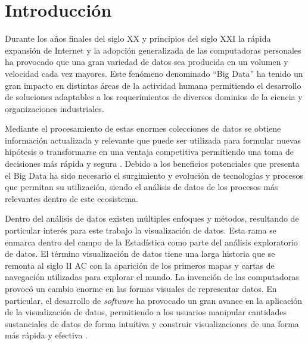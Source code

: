 \chapter*{Introducción}\label{chapter:introduction}

Durante los a\~nos finales del siglo XX y principios del siglo XXI la
r\'apida expansi\'on de Internet y la adopci\'on generalizada de las
computadoras personales ha provocado que una gran variedad de datos sea
producida en un volumen y velocidad cada vez mayores. Este fen\'omeno
denominado ``Big Data'' \cite{beyer2012importance} ha tenido un gran impacto en distintas \'areas de
la actividad humana permitiendo el desarrollo de soluciones adaptables a los
requerimientos de diversos dominios de la ciencia y organizaciones industriales.

Mediante el procesamiento de estas enormes colecciones de datos se
obtiene informaci\'on actualizada y relevante que puede ser utilizada para
formular nuevas hip\'otesis o transformarse en una ventaja competitiva permitiendo
una toma de decisiones m\'as r\'apida y segura \cite{de2016formal}. Debido a los beneficios potenciales
que presenta el Big Data ha sido necesario el surgimiento y evoluci\'on de
tecnolog\'ias y procesos que permitan su utilizaci\'on, siendo el an\'alisis
de datos de los procesos m\'as relevantes dentro de este ecosistema.

Dentro del an\'alisis de datos existen m\'ultiples enfoques y m\'etodos, resultando
de particular inter\'es para este trabajo la visualizaci\'on de datos. Esta rama se enmarca
dentro del campo de la Estad\'istica como parte del an\'alisis exploratorio de datos.
El t\'ermino visualizaci\'on de datos tiene una larga historia que se remonta al
siglo II AC con la aparici\'on de los primeros mapas y cartas de navegaci\'on utilizadas
para explorar el mundo. La invenci\'on de las computadoras provoc\'o un cambio enorme
en las formas visuales de representar datos. En particular, el desarrollo de \textit{software} ha provocado
un gran avance en la aplicaci\'on de la visualizaci\'on de datos, permitiendo a los usuarios
manipular cantidades sustanciales de datos de forma intuitiva y construir
visualizaciones de una forma m\'as r\'apida y efectiva \cite{li2020overview}. 

